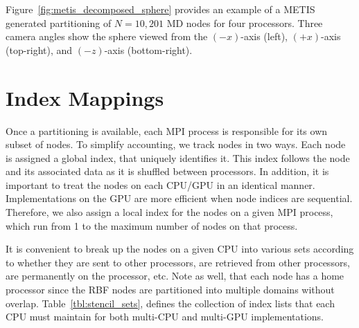 \documentclass{report}
\begin{document}
Figure~\ref{fig:metis_decomposed_sphere} provides an example of a METIS generated partitioning of $N=10,201$ MD nodes for four processors. Three camera angles show the sphere viewed from the $(-x)$-axis (left), $(+x)$-axis (top-right), and $(-z)$-axis (bottom-right). 









\section{Index Mappings}

Once a partitioning is available, each MPI process is responsible for its own subset of nodes. 
To simplify accounting, we track nodes in two ways. Each node is assigned
a global index, that uniquely identifies it. This index follows the node 
and its associated data as it is shuffled between processors. In addition, 
it is important to treat the nodes on each CPU/GPU in an identical manner. 
Implementations on the GPU are more efficient when node indices
are sequential. Therefore, we also assign a local index for the nodes on 
a given MPI process, which run from 1 to the maximum number of nodes on that process. 


It is convenient to break up the nodes on a given CPU into various sets
according to whether they are sent to other processors, are retrieved from 
other processors, are permanently on the processor, etc. Note as well, 
that each node has a home processor since the RBF nodes are partitioned into 
multiple domains without overlap.
Table~\ref{tbl:stencil_sets}, defines the collection of index lists that each CPU must maintain for both multi-CPU and multi-GPU implementations.  
\end{document}
